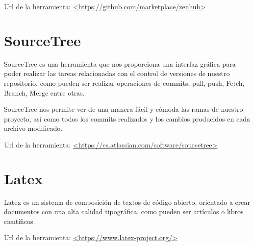 Url de la herramienta: \url{<https://github.com/marketplace/zenhub>}

\section{SourceTree}

SourceTree es una herramienta que nos proporciona una interfaz gráfica para poder realizar las tareas relacionadas con el control de versiones de nuestro repositorio, como pueden ser realizar  operaciones de commits, pull, push, Fetch, Branch, Merge entre otras.

SourceTree nos permite ver de una manera fácil y cómoda las ramas de nuestro proyecto, así como todos los commits realizados y los cambios producidos en cada archivo modificado.

Url de la herramienta: \url{<https://es.atlassian.com/software/sourcetree>}

\section{Latex}

Latex es un sistema de composición de textos de código abierto, orientado a crear documentos con una alta calidad tipográfica, como pueden ser artículos o libros científicos.\cite{wiki:Latex}

Url de la herramienta: \url{<https://www.latex-project.org/>}


